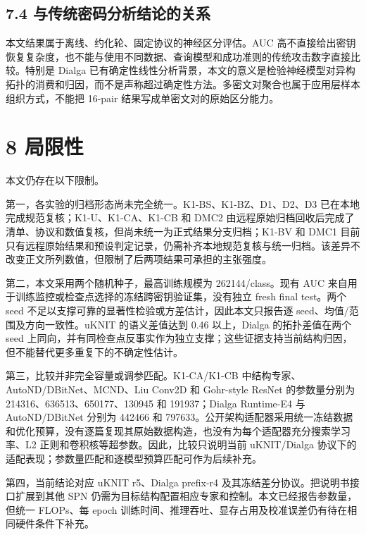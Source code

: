 \documentclass{templates/cjc-utf8}
\begin{document}
\hypertarget{ux4e0eux4f20ux7edfux5bc6ux7801ux5206ux6790ux7ed3ux8bbaux7684ux5173ux7cfb}{%
\subsection{7.4
与传统密码分析结论的关系}\label{ux4e0eux4f20ux7edfux5bc6ux7801ux5206ux6790ux7ed3ux8bbaux7684ux5173ux7cfb}}

本文结果属于离线、约化轮、固定协议的神经区分评估。AUC
高不直接给出密钥恢复复杂度，也不能与使用不同数据、查询模型和成功准则的传统攻击数字直接比较。特别是
Dialga
已有确定性线性分析背景，本文的意义是检验神经模型对异构拓扑的消费和归因，而不是声称超过确定性方法。多密文对聚合也属于应用层样本组织方式，不能把
16-pair 结果写成单密文对的原始区分能力。

\hypertarget{ux5c40ux9650ux6027}{%
\section{8 局限性}\label{ux5c40ux9650ux6027}}

本文仍存在以下限制。

第一，各实验的归档形态尚未完全统一。K1-BS、K1-BZ、D1、D2、D3
已在本地完成规范复核；K1-U、K1-CA、K1-CB 和 DMC2
由远程原始归档回收后完成了清单、协议和数值复核，但尚未统一为正式结果分支归档；K1-BV
和 DMC1 目前只有远程原始结果和预设判定记录，仍需补齐本地规范复核与统一归档。该差异不改变正文所列数值，但限制了后两项结果可承担的主张强度。

第二，本文采用两个随机种子，最高训练规模为 262144/class。现有 AUC
来自用于训练监控或检查点选择的冻结跨密钥验证集，没有独立 fresh final
test。两个 seed 不足以支撑可靠的显著性检验或方差估计，因此本文只报告逐
seed、均值/范围及方向一致性。uKNIT 的语义差值达到 0.46 以上，Dialga
的拓扑差值在两个 seed
上同向，并有同检查点反事实作为独立支撑；这些证据支持当前结构归因，但不能替代更多重复下的不确定性估计。

第三，比较并非完全容量或调参匹配。K1-CA/K1-CB
中结构专家、AutoND/DBitNet、MCND、Liu Conv2D 和 Gohr-style ResNet
的参数量分别为 214316、636513、650177、130945 和 191937；Dialga
Runtime-E4 与 AutoND/DBitNet 分别为 442466 和
797633。公开架构适配器采用统一冻结数据和优化预算，没有逐篇复现其原始数据构造，也没有为每个适配器充分搜索学习率、L2
正则和卷积核等超参数。因此，比较只说明当前 uKNIT/Dialga
协议下的适配表现；参数量匹配和逐模型预算匹配可作为后续补充。

第四，当前结论对应 uKNIT r5、Dialga prefix-r4
及其冻结差分协议。把说明书接口扩展到其他 SPN
仍需为目标结构配置相应专家和控制。本文已经报告参数量，但统一 FLOPs、每
epoch 训练时间、推理吞吐、显存占用及校准误差仍有待在相同硬件条件下补充。
\end{document}
